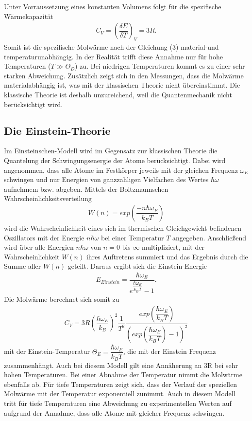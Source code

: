 Unter Vorraussetzung eines konstanten Volumens folgt für die spezifische Wärmekapazität
\begin{align}
C_V=\left(\dfrac{\delta E}{\delta T}\right)_V=3R.
\end{align}
Somit ist die spezifische Molwärme nach der Gleichung (3) material-und temperaturunabhängig. In der Realität trifft diese Annahme nur für hohe Temperaturen ($T\gg\Theta_D$) zu. Bei niedrigen Temperaturen kommt es zu einer sehr starken Abweichung. Zusätzlich zeigt sich in den Messungen, dass die Molwärme materialabhängig ist, was mit der klassischen Theorie nicht übereinstimmt. Die klassische Theorie ist deshalb unzureichend, weil die Quantenmechanik nicht berücksichtigt wird.
\subsection{Die Einstein-Theorie}
Im Einsteinschen-Modell wird im Gegensatz zur klassischen Theorie die Quantelung der Schwingungsenergie der Atome berücksichtigt. Dabei wird angenommen, dass alle Atome im Festkörper jeweils mit der gleichen Frequenz $\omega_E$ schwingen und nur Energien von ganzzahligen Vielfachen des Wertes $\hbar\omega$ aufnehmem bzw. abgeben. Mittels der Boltzmannschen Wahrscheinlichkeitsverteilung 
\begin{align}
W(n)=exp\left(\dfrac{-n\hbar \omega_E}{k_BT}\right)
\end{align}
wird die Wahrscheinlichkeit eines sich im thermischen Gleichgewicht befindenen Oszillators mit der Energie $n\hbar\omega$ bei einer Temperatur $T$ angegeben. Anschließend wird über alle Energien $n \hbar \omega$ von $n=0$ bis $\infty$ multipliziert, mit der Wahrscheinlichkeit $W(n)$ ihres Auftretens summiert und das Ergebnis durch die Summe aller $W(n)$ geteilt. Daraus ergibt sich die Einstein-Energie
\begin{align}
E_{Einstein}=\dfrac{\hbar\omega_E}{e^{\dfrac{\hbar \omega_E}{k_BT}}-1}.
\end{align}
Die Molwärme berechnet sich somit zu 
\begin{align}
C_V=3R\left(\dfrac{\hbar\omega_E}{k_B}\right)^2 \dfrac{1}{T^2} \dfrac{exp\left(\dfrac{\hbar\omega_E}{k_BT}\right)}{\left(exp\left(\dfrac{\hbar \omega_E }{k_BT}\right)-1\right)^2}
\end{align}
mit der Einstein-Temperatur $\Theta_E=\dfrac{\hbar \omega_E}{k_BT}$, die mit der Einstein Frequenz zusammenhängt. Auch bei diesem Modell gilt eine Annäherung an 3R bei sehr hohen Temperaturen. Bei einer Abnahme der Temperatur nimmt die Molwärme ebenfalls ab. Für tiefe Temperaturen zeigt sich, dass der Verlauf der speziellen Molwärme mit der Temperatur exponentiell zunimmt. Auch in diesem Modell tritt für tiefe Temperaturen eine Abweichung zu experimentellen Werten auf aufgrund der Annahme, dass alle Atome mit gleicher Frequenz schwingen. 
